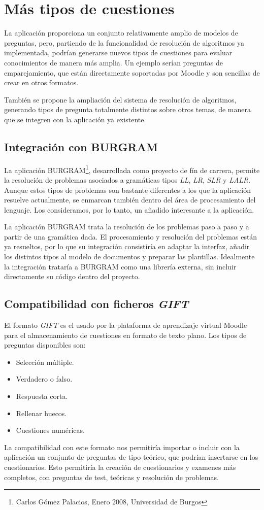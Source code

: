 \section{Más tipos de cuestiones}
La aplicación proporciona un conjunto relativamente amplio de modelos de preguntas, pero, partiendo de la funcionalidad de resolución de algoritmos ya implementada, podrían generarse nuevos tipos de cuestiones para evaluar conocimientos de manera más amplia.
Un ejemplo serían preguntas de emparejamiento, que están directamente soportadas por Moodle y son sencillas de crear en otros formatos.

También se propone la ampliación del sistema de resolución de algoritmos, generando tipos de pregunta totalmente distintos sobre otros temas, de manera que se integren con la aplicación ya existente.

\subsection{Integración con BURGRAM}
La aplicación BURGRAM\footnote{Carlos Gómez Palacios, Enero 2008, Universidad de Burgos}, desarrollada como proyecto de fín de carrera, permite la resolución de problemas asociados a gramáticas tipos \emph{LL}, \emph{LR}, \emph{SLR} y \emph{LALR}.
Aunque estos tipos de problemas son bastante diferentes a los que la aplicación resuelve actualmente, se enmarcan también dentro del área de procesamiento del lenguaje.
Los consideramos, por lo tanto, un añadido interesante a la aplicación.

La aplicación BURGRAM trata la resolución de los problemas paso a paso y a partir de una gramática dada.
El procesamiento y resolución del problemas están ya resueltos, por lo que su integración consistiría en adaptar la interfaz, añadir los distintos tipos al modelo de documentos y preparar las plantillas.
Idealmente la integración trataría a BURGRAM como una librería externa, sin incluir directamente su código dentro del proyecto.

\subsection{Compatibilidad con ficheros \emph{GIFT}}
El formato \emph{GIFT} es el usado por la plataforma de aprendizaje virtual Moodle para el almacenamiento de cuestiones en formato de texto plano.
Los tipos de preguntas disponibles son:
\begin{itemize}
	\item Selección múltiple.
	\item Verdadero o falso.
	\item Respuesta corta.
	\item Rellenar huecos.
	\item Cuestiones numéricas.
\end{itemize}

La compatibilidad con este formato nos permitiría importar o incluir con la aplicación un conjunto de preguntas de tipo teórico, que podrían insertarse en los cuestionarios.
Esto permitiría la creación de cuestionarios y examenes más completos, con preguntas de test, teóricas y resolución de problemas.
